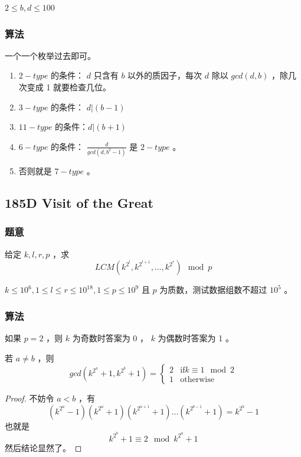 \documentclass[11pt]{article}
\begin{document}
    $2 \leq b, d \leq 100$
\subsubsection{算法}
\label{sec-10-7-2}

    一个一个枚举过去即可。
\begin{enumerate}
\item $2-type$ 的条件： $d$ 只含有 $b$ 以外的质因子，每次 $d$ 除以 $gcd (d, b)$ ，除几次变成 1 就要检查几位。
\item $3-type$ 的条件： $d \vert (b - 1)$
\item $11-type$ 的条件：$d \vert (b + 1)$
\item $6-type$ 的条件： $\frac{d}{gcd (d, b^2 - 1)}$ 是 $2-type$ 。
\item 否则就是 $7-type$ 。
\end{enumerate}
\subsection{185D  Visit of the Great}
\label{sec-10-8}
\subsubsection{题意}
\label{sec-10-8-1}

    给定 $k, l, r, p$ ，求
    $$LCM (k^{2^l}, k^{2^{l + 1}}, \dots, k^{2^{r}}) \mod{p}$$

    $k \leq 10^6, 1 \leq l \leq r \leq 10^18, 1 \leq p \leq 10^9$ 且 $p$ 为质数，测试数据组数不超过 $10^5$ 。
\subsubsection{算法}
\label{sec-10-8-2}

    如果 $p = 2$ ，则 $k$ 为奇数时答案为 0 ， $k$ 为偶数时答案为 1 。

\begin{theorem}
  若 $a \neq b$ ，则 
  $$gcd (k^{2^a} + 1, k^{2^b} + 1) = \begin{cases} 2 & \text{if} k \equiv 1 \mod{2} \\ 1 & \text{otherwise}\end{cases}$$
\end{theorem}
\begin{proof}
  不妨令 $a < b$ ，有
  $$
  (k^{2^a} - 1)(k^{2^a} + 1)(k^{2^{a + 1}} + 1) \dots (k^{2^{b - 1}} + 1) = k^{2^b} - 1
  $$
  也就是 $$k^{2^b} + 1 \equiv 2 \mod{k^{2^a} + 1}$$
  然后结论显然了。
\end{proof}
\end{document}
